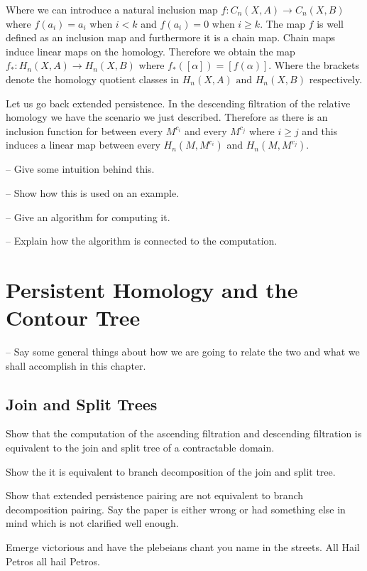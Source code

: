 
Where we can introduce a natural inclusion map $f : C_n(X, A) \to C_n(X, B)$ where $f(a_i) = a_i$ when $i < k$ and $f(a_i) = 0$ when $i \ge k$. The map $f$ is well defined as an inclusion map and furthermore it is a chain map. Chain maps induce linear maps on the homology. Therefore we obtain the map $f_* : H_n(X, A) \to H_n(X, B)$ where $f_*([\alpha]) = [f(\alpha)]$. Where the brackets denote the homology quotient classes in $H_n(X, A) \text{ and } H_n(X, B)$ respectively.


Let us go back extended persistence. In the descending filtration of the relative homology we have the scenario we just described. Therefore as there is an inclusion function for between every $M^{c_i}$ and every $M^{c_j}$ where $i \ge j$ and this induces a linear map between every $H_n(M, M^{c_i})$ and $H_n(M, M^{c_j})$.


-- Give some intuition behind this.

-- Show how this is used on an example.

-- Give an algorithm for computing it.

-- Explain how the algorithm is connected to the computation.

\section{Persistent Homology and the Contour Tree}

-- Say some general things about how we are going to relate the two and what we shall accomplish in this chapter.

\subsection{Join and Split Trees}

Show that the computation of the ascending filtration and descending filtration is equivalent to the join and split tree of a contractable domain.

Show the it is equivalent to branch decomposition of the join and split tree.

Show that extended persistence pairing are not equivalent to branch decomposition pairing. Say the paper is either wrong or had something else in mind which is not clarified well enough.

Emerge victorious and have the plebeians chant you name in the streets. All Hail Petros all hail Petros.



